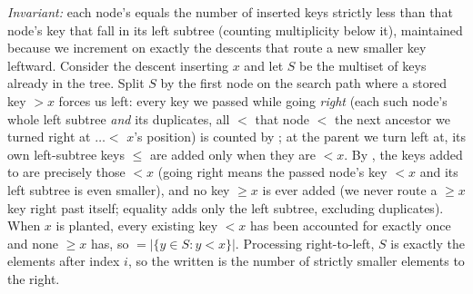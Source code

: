 \begin{proofbox}
\emph{Invariant:} each node's  equals the number of inserted keys strictly less than
that node's key that fall in its left subtree (counting multiplicity below it), maintained because we
increment  on exactly the descents that route a new smaller key leftward. Consider the
descent inserting $x$ and let $S$ be the multiset of keys already in the tree. Split $S$ by the first
node on the search path where a stored key $>\!x$ forces us left: every key we passed while going
\emph{right} (each such node's whole left subtree \emph{and} its duplicates, all $<$ that node $<$ the
next ancestor we turned right at $\ldots <$ $x$'s position) is counted by ; at the
parent we turn left at, its own left-subtree keys $\le$ are added only when they are $<x$. By
, the keys added to  are precisely those $<x$ (going right means the
passed node's key $<x$ and its left subtree is even smaller), and no key $\ge x$ is ever added (we
never route a $\ge x$ key right past itself; equality adds only the left subtree, excluding
duplicates). When $x$ is planted, every existing key $<x$ has been accounted for exactly once and
none $\ge x$ has, so $=|\{y\in S: y<x\}|$. Processing right-to-left, $S$ is exactly the
elements after index $i$, so the written  is the number of strictly smaller elements to
the right. \end{proofbox}

